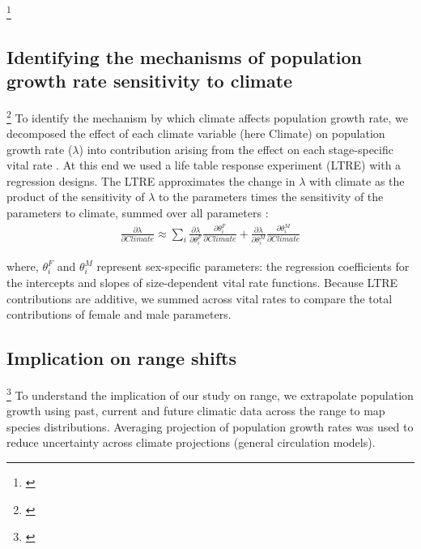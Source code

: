 \documentclass[11pt]{article}\usepackage[]{graphicx}\usepackage[usenames,dvipsnames]{xcolor}
\newcommand{\tom}[2]{{\color{red}{#1}}\footnote{\textit{\color{red}{#2}}}}
\begin{document}
\tom{Because the two-sex MPM is nonlinear (vital rates affect and are affected by population structure) we estimated the asymptotic geometric growth rate ($\lambda$) by numerical simulation, and repeated this across a range of climate.}{I think methods for projecting across a range of climate need to be described in greater detail. Also you say here at you analyzed the two-sex IPM through simulation but the female-dominant version can be analyzed through eigenanalysis, and I think you are presenting both, so this should be explained.}

\subsection*{Identifying the mechanisms of population growth rate sensitivity to climate }
\tom{}{I don't think the LTRE analysis is adequately motivated by the Intro. I have not edited much here but we can talk about it.}
To identify the mechanism by which climate affects population growth rate, we decomposed the effect of each climate variable (here Climate) on population growth rate ($\lambda$) into contribution arising from the effect on each stage-specific vital rate \citep{caswell2000matrix}.
At this end we used a life table response experiment (LTRE) with a regression designs. 
The LTRE approximates the change in $\lambda$ with climate  as the product of the sensitivity of $\lambda$ to the parameters times the sensitivity of the parameters to climate, summed over all parameters \citep{caswell1989analysis}:
\begin{align}\label{eq:ltre}
\frac{\partial \lambda}{\partial Climate} \approx \sum_{i} \frac{\partial \lambda}{\partial \theta^{F}_{i}} \frac{\partial \theta^{F}_{i}}{\partial Climate} + \frac{\partial \lambda}{\partial \theta^{M}_{i}} \frac{\partial \theta^{M}_{i}}{\partial Climate}
\end{align}

\noindent where, $\theta^{F}_{i}$ and $\theta^{M}_{i}$ represent sex-specific parameters: the regression coefficients for the intercepts and slopes of size-dependent vital rate functions. 
Because LTRE contributions are additive, we summed across vital rates to compare the total contributions of female and male parameters. 

\subsection*{Implication on range shifts}
\tom{}{I think this section should be expanded. In general, you did a great job of presenting the model but you have not effectively communicated how you are using the model to answer your questions.}
To understand the implication of our study on range, we extrapolate population growth using past, current and future climatic data  across the range to map species distributions. 
Averaging projection of population growth rates was used to reduce uncertainty across climate projections (general circulation models). 
\end{document}
